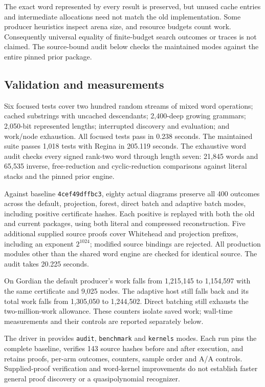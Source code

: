 The exact word represented by every result is preserved, but unused cache
entries and intermediate allocations need not match the old implementation.
Some producer heuristics inspect arena size, and resource budgets count work.
Consequently universal equality of finite-budget search outcomes or traces
is not claimed. The source-bound audit below checks the maintained modes
against the entire pinned prior package.

\subsection{Validation and measurements}

Six focused tests cover two hundred random streams of mixed word operations;
cached substrings with uncached descendants; 2,400-deep growing grammars;
2,050-bit represented lengths; interrupted discovery and evaluation; and
work/node exhaustion. All focused tests pass in 0.238 seconds. The maintained suite passes
1,018 tests with Regina in 205.119 seconds. The exhaustive
word audit checks every signed rank-two word through length seven: 21,845
words and 65,535 inverse, free-reduction and cyclic-reduction comparisons
against literal stacks and the pinned prior engine.

Against baseline \texttt{4cef49dffbc3}, eighty actual diagrams preserve all
400 outcomes across the default, projection, forest, direct batch and adaptive
batch modes, including positive certificate hashes. Each positive is replayed
with both the old and current packages, using both literal and compressed
reconstruction. Five additional supplied source proofs cover Whitehead and
projection prefixes, including an exponent $2^{1024}$; modified source bindings
are rejected. All production modules other than the shared word engine are
checked for identical source. The audit takes 20.225 seconds.

On Gordian the default producer's work falls from 1,215,145 to 1,154,597 with
the same certificate and 9,025 nodes. The adaptive host still falls back and
its total work falls from 1,305,050 to 1,244,502. Direct batching still exhausts
the two-million-work allowance. These counters isolate saved work; wall-time
measurements and their controls are reported separately below.



The driver  in 
provides \texttt{audit}, \texttt{benchmark} and \texttt{kernels} modes. Each
run pins the complete baseline, verifies 143 source hashes before and after
execution, and retains proofs, per-arm outcomes, counters, sample order and
A/A controls. Supplied-proof verification and word-kernel improvements do not
establish faster general proof discovery or a quasipolynomial recognizer.
